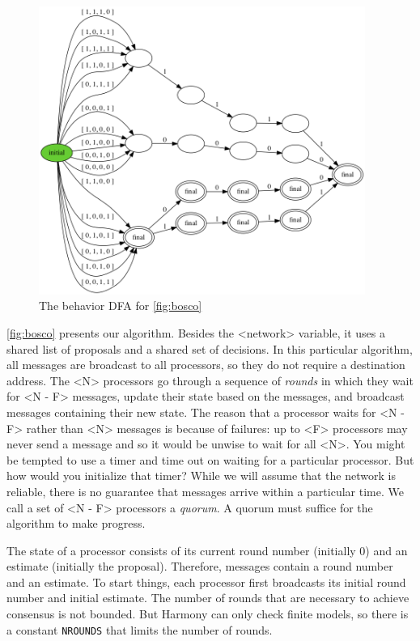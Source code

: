 \documentclass{report}
\begin{document}
\begin{figure}
\begin{center}
\includegraphics[width=0.95\textwidth]{figures/bosco.png}
\end{center}
\caption{The behavior DFA for \autoref{fig:bosco}}
\label{fig:boscodfa}
\end{figure}

\autoref{fig:bosco} presents our algorithm.  Besides the <{network}>
variable,
it uses a shared list of proposals and a shared set of decisions.
In this particular algorithm, all messages are broadcast to all processors, so they do
not require a destination address.
The <{N}> processors go through a sequence of \emph{rounds} in which they wait for
<{N - F}> messages, update their state based on the messages, and
broadcast messages containing their new state.
The reason that a processor waits for <{N - F}> rather than <{N}>
messages is because of failures: up to <{F}> processors may never send a message
and so it would be unwise to wait for all <{N}>.  You might be tempted to use
a timer and time out on waiting for a particular processor.  But how would you initialize
that timer?  While we will assume that the network is reliable, there is no guarantee
that messages arrive within a particular time.
We call a set of <{N - F}> processors a \emph{quorum}.
A quorum must suffice for the algorithm to make progress.

The state of a processor consists of its current round number (initially 0)
and an estimate (initially the proposal).  Therefore, messages contain
a round number and an estimate. To start things, each processor first
broadcasts its initial round number and initial estimate.
The number of rounds that are necessary to achieve consensus is not bounded.  But
Harmony can only check finite models, so there is a constant \texttt{NROUNDS} that
limits the number of rounds.
\end{document}
